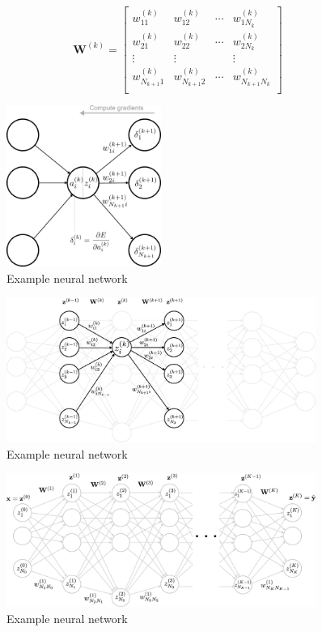 \documentclass{article}
\begin{document}
\begin{equation}
\mathbf{W}^{(k)} = 
    \begin{bmatrix}
        w_{11}^{(k)} & w_{12}^{(k)} & \cdots & w_{1 N_k}^{(k)}\\[2ex]
        w_{21}^{(k)} & w_{22}^{(k)} & \cdots & w_{2 N_k}^{(k)}\\[2ex]
        \vdots & \vdots &  & \vdots\\[2ex]
        w_{N_{k+1} 1}^{(k)} & w_{N_{k+1} 2}^{(k)} & \cdots & w_{N_{k+1} N_k }^{(k)}\\[2ex]
    \end{bmatrix}
\end{equation}





\begin{figure}[h]
\centering
\includegraphics[width=0.45\textwidth]{./neural_networks_local_backpropagation.eps}
\caption{Example neural network}
\end{figure}

\begin{figure}[h]
\centering
\includegraphics[width=0.9\textwidth]{./neural_networks_full_focused_example.eps}
\caption{Example neural network}
\end{figure}

\begin{figure}[h]
\centering
\includegraphics[width=0.9\textwidth]{./neural_networks_full_with_labels.eps}
\caption{Example neural network}
\end{figure}
\end{document}

